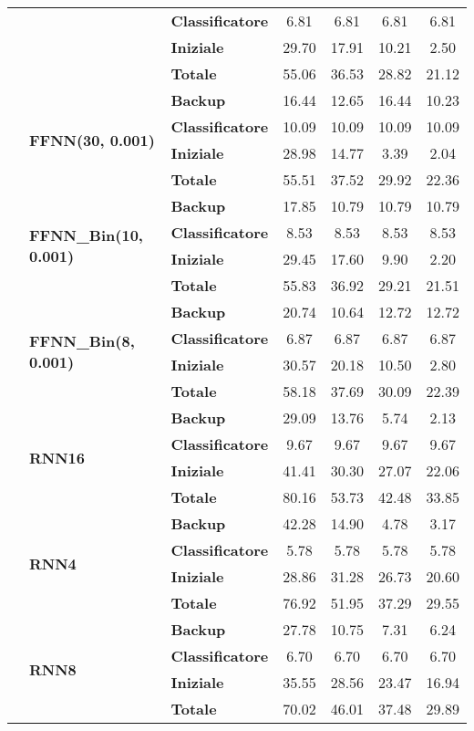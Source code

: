 \begin{table}[H]
\begin{tabular}{|l|l|l|c|c|c|c|}
     &      & \textbf{Classificatore} &  6.81 &  6.81 &  6.81 &  6.81 \\
     &      & \textbf{Iniziale} & 29.70 & 17.91 & 10.21 &  2.50 \\
     &      & \textbf{Totale} & 55.06 & 36.53 & 28.82 & 21.12 \\
\cline{2-7}
     & \multirow{4}{*}{\textbf{FFNN(30, 0.001)}} & \textbf{Backup} & 16.44 & 12.65 & 16.44 & 10.23 \\
     &      & \textbf{Classificatore} & 10.09 & 10.09 & 10.09 & 10.09 \\
     &      & \textbf{Iniziale} & 28.98 & 14.77 &  3.39 &  2.04 \\
     &      & \textbf{Totale} & 55.51 & 37.52 & 29.92 & 22.36 \\
\cline{2-7}
     & \multirow{4}{*}{\textbf{FFNN\_Bin(10, 0.001)}} & \textbf{Backup} & 17.85 & 10.79 & 10.79 & 10.79 \\
     &      & \textbf{Classificatore} &  8.53 &  8.53 &  8.53 &  8.53 \\
     &      & \textbf{Iniziale} & 29.45 & 17.60 &  9.90 &  2.20 \\
     &      & \textbf{Totale} & 55.83 & 36.92 & 29.21 & 21.51 \\
\cline{2-7}
     & \multirow{4}{*}{\textbf{FFNN\_Bin(8, 0.001)}} & \textbf{Backup} & 20.74 & 10.64 & 12.72 & 12.72 \\
     &      & \textbf{Classificatore} &  6.87 &  6.87 &  6.87 &  6.87 \\
     &      & \textbf{Iniziale} & 30.57 & 20.18 & 10.50 &  2.80 \\
     &      & \textbf{Totale} & 58.18 & 37.69 & 30.09 & 22.39 \\
\cline{2-7}
     & \multirow{4}{*}{\textbf{RNN16}} & \textbf{Backup} & 29.09 & 13.76 &  5.74 &  2.13 \\
     &      & \textbf{Classificatore} &  9.67 &  9.67 &  9.67 &  9.67 \\
     &      & \textbf{Iniziale} & 41.41 & 30.30 & 27.07 & 22.06 \\
     &      & \textbf{Totale} & 80.16 & 53.73 & 42.48 & 33.85 \\
\cline{2-7}
     & \multirow{4}{*}{\textbf{RNN4}} & \textbf{Backup} & 42.28 & 14.90 &  4.78 &  3.17 \\
     &      & \textbf{Classificatore} &  5.78 &  5.78 &  5.78 &  5.78 \\
     &      & \textbf{Iniziale} & 28.86 & 31.28 & 26.73 & 20.60 \\
     &      & \textbf{Totale} & 76.92 & 51.95 & 37.29 & 29.55 \\
\cline{2-7}
     & \multirow{4}{*}{\textbf{RNN8}} & \textbf{Backup} & 27.78 & 10.75 &  7.31 &  6.24 \\
     &      & \textbf{Classificatore} &  6.70 &  6.70 &  6.70 &  6.70 \\
     &      & \textbf{Iniziale} & 35.55 & 28.56 & 23.47 & 16.94 \\
     &      & \textbf{Totale} & 70.02 & 46.01 & 37.48 & 29.89 \\
\hline
\end{tabular}
\end{table}
